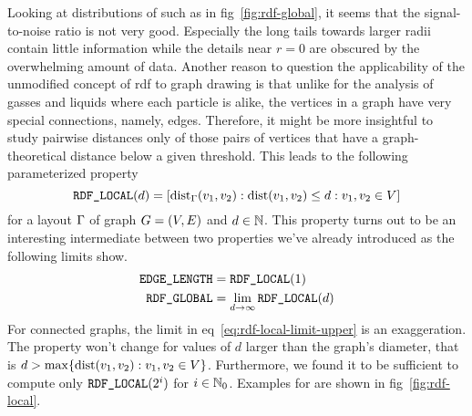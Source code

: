 \documentclass{graphstudy}
\begin{document}
Looking at distributions of  such as in \acl{fig}~\ref{fig:rdf-global}, it seems that the
signal-to-noise ratio is not very good.  Especially the long tails towards larger radii contain little information while
the details near \(r=0\) are obscured by the overwhelming amount of data.  Another reason to question the applicability
of the unmodified concept of \ac{rdf} to graph drawing is that unlike for the analysis of gasses and liquids where each
particle is alike, the vertices in a graph have very special connections, namely, edges.  Therefore, it might be more
insightful to study pairwise distances only of those pairs of vertices that have a graph-theoretical distance below a
given threshold.  This leads to the following parameterized property
\begin{equation}
  \mbox{\text{\upshape\ttfamily RDF\_LOCAL}}(d) = \left[\operatorname{dist}_\Gamma(v_1,v_2):\operatorname{dist}(v_1,v_2)\leq{}d:{}v_1,v_2\in V\right]
\end{equation}
for a layout \(\Gamma\) of graph \(G=(V,E)\) and \(d\in\mathbb{N}\).  This property turns out to be an interesting
intermediate between two properties we've already introduced as the following limits show.
\begin{align}
  \mbox{\text{\upshape\ttfamily EDGE\_LENGTH}} &= \mbox{\text{\upshape\ttfamily RDF\_LOCAL}}(1)                     \label{eq:rdf-local-limit-lower}\\
  \mbox{\text{\upshape\ttfamily RDF\_GLOBAL}}  &= \lim_{d\to\infty} \mbox{\text{\upshape\ttfamily RDF\_LOCAL}}(d)   \label{eq:rdf-local-limit-upper}
\end{align}
For connected graphs, the limit in \acl{eq}~\ref{eq:rdf-local-limit-upper} is an exaggeration.  The property won't
change for values of \(d\) larger than the graph's diameter, that is
\(d>\max\{\operatorname{dist}(v_1,v_2):{}v_1,v_2\in V\}\).  Furthermore, we found it to be sufficient to compute only
\(\mbox{\text{\upshape\ttfamily RDF\_LOCAL}}(2^i)\) for \(i\in\mathbb{N}_0\).  Examples for  are shown in
\acl{fig}~\ref{fig:rdf-local}.
\end{document}
